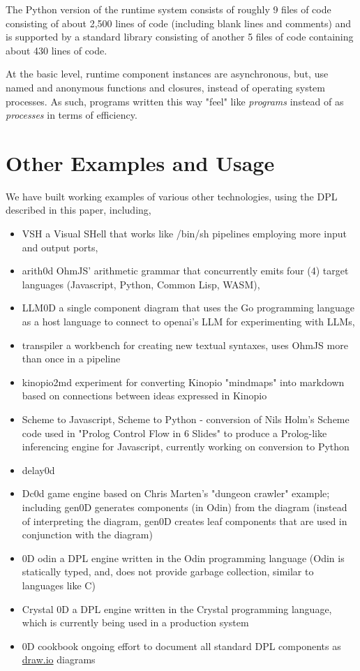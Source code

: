 \documentclass[10pt]{acmart}
\begin{document}
The Python version of the runtime system consists of roughly 9 files of
code consisting of about 2,500 lines of code (including blank lines and
comments) and is supported by a standard library consisting of another 5
files of code containing about 430 lines of code.

At the basic level, runtime component instances are asynchronous, but,
use named and anonymous functions and closures, instead of operating
system processes. As such, programs written this way "feel" like
\emph{programs} instead of as \emph{processes} in terms of efficiency.

\section{Other Examples and Usage}
We have built working examples of various other technologies, using the
DPL described in this paper, including,

\begin{itemize}
\item VSH a Visual SHell that works like /bin/sh pipelines employing more input and output ports,
\item arith0d OhmJS' arithmetic grammar that concurrently emits four (4) target languages (Javascript, Python, Common Lisp, WASM),
\item LLM0D a single component diagram that uses the Go programming language as a host language to connect to openai's LLM for experimenting with LLMs,
\item transpiler a workbench for creating new textual syntaxes, uses OhmJS more than once in a pipeline
\item kinopio2md experiment for converting Kinopio "mindmaps" into markdown based on connections between ideas expressed in Kinopio
\item Scheme to Javascript, Scheme to Python - conversion of Nils Holm's Scheme code used in "Prolog Control Flow in 6 Slides" to produce a Prolog-like inferencing engine for Javascript, currently working on conversion to Python
\item delay0d
\item Dc0d game engine based on Chris Marten's "dungeon crawler" example\cite{ceptre_paper}; including gen0D generates components (in Odin) from the diagram (instead of interpreting the diagram, gen0D creates leaf components that are used in conjunction with the diagram)
\item 0D odin a DPL engine written in the Odin programming language (Odin is statically typed, and, does not provide garbage collection, similar to languages like C)
\item Crystal 0D a DPL engine written in the Crystal programming language, which is currently being used in a production system
\item 0D cookbook ongoing effort to document all standard DPL components as \href{http://draw.io}{draw.io} diagrams
\end{itemize}
\end{document}
